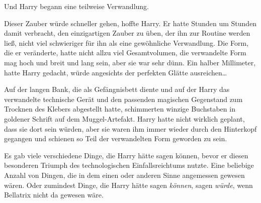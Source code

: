 Und Harry begann eine teilweise Verwandlung.

Dieser Zauber würde schneller gehen, hoffte Harry. Er hatte Stunden um Stunden damit verbracht, den einzigartigen Zauber zu üben, der ihn zur Routine werden ließ, nicht viel schwieriger für ihn als eine gewöhnliche Verwandlung. Die Form, die er veränderte, hatte nicht allzu viel Gesamtvolumen, die verwandelte Form mag hoch und breit und lang sein, aber sie war sehr dünn. Ein halber Millimeter, hatte Harry gedacht, würde angesichts der perfekten Glätte ausreichen…

Auf der langen Bank, die als Gefängnisbett diente und auf der Harry das verwandelte technische Gerät und den passenden magischen Gegenstand zum Trocknen des Klebers abgestellt hatte, schimmerten winzige Buchstaben in goldener Schrift auf dem Muggel-Artefakt. Harry hatte nicht wirklich geplant, dass sie dort sein würden, aber sie waren ihm immer wieder durch den Hinterkopf gegangen und schienen so Teil der verwandelten Form geworden zu sein.

Es gab viele verschiedene Dinge, die Harry hätte sagen können, bevor er diesen besonderen Triumph des technologischen Einfallsreichtums nutzte. Eine beliebige Anzahl von Dingen, die in dem einen oder anderen Sinne angemessen gewesen wären. Oder zumindest Dinge, die Harry hätte sagen \emph{können}, sagen \emph{würde}, wenn Bellatrix nicht da gewesen wäre.

